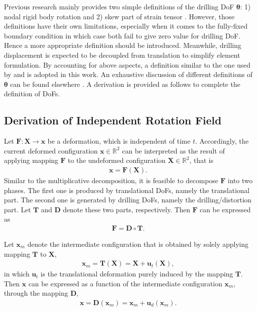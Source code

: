 \documentclass[3p,sort&compress,review,11pt]{elsarticle}
\begin{document}
Previous research mainly provides two simple definitions of the drilling DoF $\mathbold{\theta}$: 1) nodal rigid body rotation \citep{Allman1984} and 2) skew part of strain tensor \citep[e.g.,][]{Hughes1989,Ibrahimbegovic1990,Ibrahimbegovic1992,Ibrahimbegovic1993,Boutagouga2016}. However, those definitions have their own limitations, especially when it comes to the fully-fixed boundary condition in which case both fail to give zero value for drilling DoF. Hence a more appropriate definition should be introduced. Meanwhile, drilling displacement is expected to be decoupled from translation to simplify element formulation. By accounting for above aspects, a definition similar to the one used by \citet{Sze1992} and \citet{Long1994} is adopted in this work. An exhaustive discussion of different definitions of $\mathbold{\theta}$ can be found elsewhere \citep{Long2009}. A derivation is provided as follows to complete the definition of DoFs.
\subsection{Derivation of Independent Rotation Field}
Let $\mathbold{F}:\mathbold{X}\rightarrow\mathbold{x}$ be a deformation, which is independent of time $t$. Accordingly, the current deformed configuration $\mathbold{x}\in\mathbb{R}^2$ can be interpreted as the result of applying mapping $\mathbold{F}$ to the undeformed configuration $\mathbold{X}\in\mathbb{R}^2$, that is
\begin{gather}\label{eq:mapping}
\mathbold{x=F\left(X\right)}.
\end{gather}
Similar to the multiplicative decomposition, it is feasible to decompose $\mathbold{F}$ into two phases. The first one is produced by translational DoFs, namely the translational part. The second one is generated by drilling DoFs, namely the drilling/distortion part. Let $\mathbold{T}$ and $\mathbold{D}$ denote these two parts, respectively. Then $\mathbold{F}$ can be expressed as
\begin{gather*}
\mathbold{F=D\circ{}T}.
\end{gather*}

Let $\mathbold{x}_m$ denote the intermediate configuration that is obtained by solely applying mapping $\mathbold{T}$ to $\mathbold{X}$,
\begin{gather*}
\mathbold{x}_m=\mathbold{T}\left(\mathbold{X}\right)=\mathbold{X}+\mathbold{u}_t\left(\mathbold{X}\right),
\end{gather*}
in which $\mathbold{u}_t$ is the translational deformation purely induced by the mapping $\mathbold{T}$. Then $\mathbold{x}$ can be expressed as a function of the intermediate configuration $\mathbold{x}_m$, through the mapping $\mathbold{D}$,
\begin{gather*}
\mathbold{x}=\mathbold{D}\left(\mathbold{x}_m\right)=\mathbold{x}_m+\mathbold{u}_d\left(\mathbold{x}_m\right).
\end{gather*}
\end{document}
